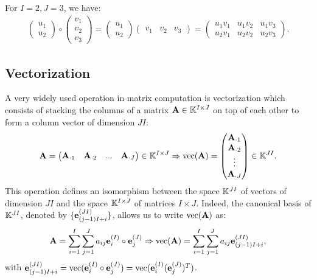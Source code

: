\begin{example}{}{}
    For $I=2,J=3$, we have:
    \begin{align*}
        \begin{pmatrix}
            u_1\\ u_{2}
        \end{pmatrix}\circ
        \begin{pmatrix}
            v_1\\ v_{2} \\v_{3}
        \end{pmatrix}
        = \begin{pmatrix}
            u_1\\ u_{2}
        \end{pmatrix} 
        \begin{pmatrix}
            v_1& v_{2} &v_{3}
        \end{pmatrix}
        = \begin{pmatrix}
            u_1v_1& u_1v_{2} & u_1v_{3}\\
            u_2v_1& u_2v_2 & u_2v_3
        \end{pmatrix}.
    \end{align*}
\end{example}

\subsection{Vectorization}
A very widely used operation in matrix computation is vectorization
which consists of stacking the columns of a matrix $\bold{A}\in \mathbb{K}^{I\times J}$
on top of each other to form a column vector of dimension $JI$:
\begin{align*}
    \bold{A}=\begin{pmatrix}
        \bold{A}_{\cdot 1}& \bold{A}_{\cdot 2} & ... & \bold{A}_{\cdot J}
    \end{pmatrix}\in \mathbb{K}^{I\times J}
    \Rightarrow \text{vec}(\bold{A}) = \begin{pmatrix}
        \bold{A}_{\cdot 1} \\ \bold{A}_{\cdot 2}\\ \vdots\\ \bold{A}
        _{\cdot J}
    \end{pmatrix}\in \mathbb{K}^{JI}.
\end{align*}
This operation defines an isomorphism between the space $\mathbb{K}^{JI}$ of vectors
of dimension $JI$ and the space $\mathbb{K}^{I\times J}$ of matrices $I\times J$.
Indeed, the canonical basis of $\mathbb{K}^{JI}$, denoted by $\{\bold{e}_{(j-1)I+i}^{(JI)}\}$, 
allows us to write $\text{vec}(\bold{A})$ as:
\begin{align*}
    \bold{A}=\sum\limits_{i=1}^{I}\sum\limits_{j=1}^{J}a_{ij}\bold{e}_i^{(I)}\circ \bold{e}_j^{(J)}
    \Rightarrow
    \text{vec}(\bold{A})=\sum\limits_{i=1}^{I}\sum\limits_{j=1}^{J}a_{ij}\bold{e}_{(j-1)I+i}^{(JI)},
\end{align*}
with $\bold{e}_{(j-1)I+i}^{(JI)}=\text{vec}(\bold{e}_i^{(I)}\circ \bold{e}_j^{(J)})=\text{vec}(\bold{e}_i^{(I)}(\bold{e}_j^{(J)})^T)$.

